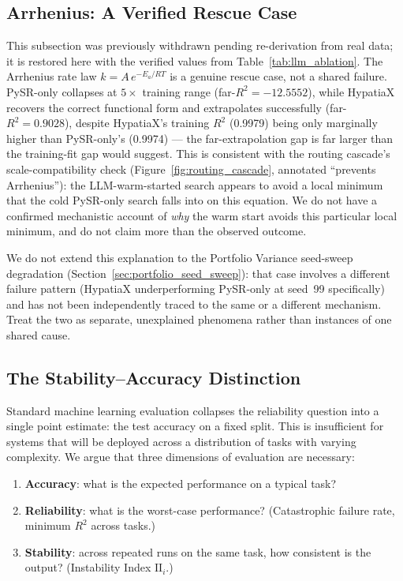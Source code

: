 \documentclass[twoside,11pt]{article}
\newcommand{\Rsq}{R^{2}}
\newcommand{\II}{\mathrm{II}}
\begin{document}
\subsection{Arrhenius: A Verified Rescue Case}\label{subsec:arrhenius-and-scaleincompatibility-failu}
\label{sec:arrhenius_failure}

This subsection was previously withdrawn pending re-derivation from real
data; it is restored here with the verified values from
Table~\ref{tab:llm_ablation}. The Arrhenius rate law $k = A\,e^{-E_a / RT}$
is a genuine rescue case, not a shared failure. PySR-only collapses at
$5\times$ training range (far-$\Rsq = -12.5552$), while HypatiaX recovers
the correct functional form and extrapolates successfully (far-$\Rsq =
0.9028$), despite HypatiaX's training $\Rsq$ (0.9979) being only marginally
higher than PySR-only's (0.9974) --- the far-extrapolation gap is far larger
than the training-fit gap would suggest. This is consistent with the
routing cascade's scale-compatibility check (Figure~\ref{fig:routing_cascade},
annotated ``prevents Arrhenius''): the LLM-warm-started search appears to
avoid a local minimum that the cold PySR-only search falls into on this
equation. We do not have a confirmed mechanistic account of \emph{why} the
warm start avoids this particular local minimum, and do not claim more than
the observed outcome.

We do not extend this explanation to the Portfolio Variance seed-sweep
degradation (Section~\ref{sec:portfolio_seed_sweep}): that case involves a
different failure pattern (HypatiaX underperforming PySR-only at seed~99
specifically) and has not been independently traced to the same or a
different mechanism. Treat the two as separate, unexplained phenomena
rather than instances of one shared cause.

\subsection{The Stability--Accuracy Distinction}\label{subsec:the-stabilityaccuracy-distinction}
\label{sec:disc_stability}

Standard machine learning evaluation collapses the reliability question into a
single point estimate: the test accuracy on a fixed split.  This is insufficient
for systems that will be deployed across a distribution of tasks with varying
complexity.  We argue that three dimensions of evaluation are necessary:
\begin{enumerate}[leftmargin=2em,label=(\roman*)]
  \item \textbf{Accuracy}: what is the expected performance on a typical task?
  \item \textbf{Reliability}: what is the worst-case performance?
    (Catastrophic failure rate, minimum $\Rsq$ across tasks.)
  \item \textbf{Stability}: across repeated runs on the same task, how consistent
    is the output?  (Instability Index $\II_i$.)
\end{enumerate}
\end{document}
